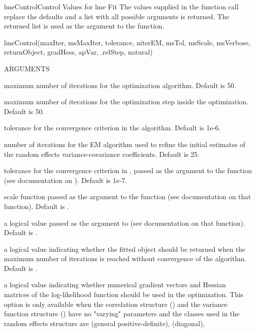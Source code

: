\documentclass[pdftex]{article} \usepackage{url,graphicx}
\begin{document}
\begin{Helpfile}{lmeControl}{Control Values for lme Fit}
The values supplied in the function call replace the defaults and a
list with all possible arguments is returned. The returned list is
used as the  argument to the  function.
\begin{Example}
lmeControl(maxIter, msMaxIter, tolerance, niterEM, msTol,
           msScale, msVerbose, returnObject, gradHess, apVar,
           .relStep, natural)
\end{Example}
\begin{Argument}{ARGUMENTS}
\item[\Co{maxIter:}]
maximum number of iterations for the 
optimization algorithm. Default is 50.
\item[\Co{msMaxIter:}]
maximum number of iterations
for the  optimization step inside the 
optimization. Default is 50.
\item[\Co{tolerance:}]
tolerance for the convergence criterion in the
 algorithm. Default is 1e-6.
\item[\Co{niterEM:}]
number of iterations for the EM algorithm used to refine
the initial estimates of the random effects variance-covariance
coefficients. Default is 25.
\item[\Co{msTol:}]
tolerance for the convergence criterion in ,
passed as the  argument to the function (see
documentation on ). Default is 1e-7. 
\item[\Co{msScale:}]
scale function passed as the  argument to
the  function (see documentation on that function). Default
is .
\item[\Co{msVerbose:}]
a logical value passed as the  argument to
 (see documentation on that function). Default is
.
\item[\Co{returnObject:}]
a logical value indicating whether the fitted
object should be returned when the maximum number of iterations is
reached without convergence of the algorithm. Default is
.
\item[\Co{gradHess:}]
a logical value indicating whether numerical gradient
vectors and Hessian matrices of the log-likelihood function should
be used in the  optimization. This option is only available
when the correlation structure () and the variance
function structure () have no "varying" parameters and
the  classes used in the random effects structure are
 (general positive-definite),  (diagonal),

\end{Argument}
\end{Helpfile}
\end{document}
